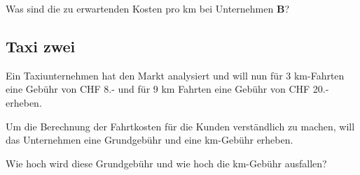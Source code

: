 Was sind die zu erwartenden Kosten pro km bei Unternehmen \textbf{B}?

\subsection{Taxi zwei}
Ein Taxiunternehmen hat den Markt analysiert und will nun für 3
km-Fahrten  eine Gebühr von CHF 8.- und für 9 km Fahrten eine Gebühr
von CHF 20.- erheben.

Um die Berechnung der Fahrtkosten für die Kunden verständlich zu
machen, will das Unternehmen eine Grundgebühr und eine km-Gebühr
erheben.

Wie hoch wird diese Grundgebühr und wie hoch die km-Gebühr ausfallen?



